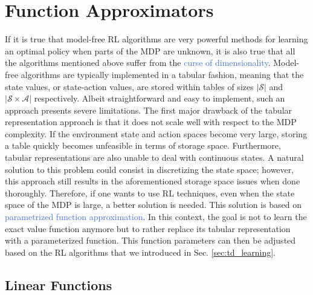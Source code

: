\section{Function Approximators}
\label{sec:function_approximators}
If it is true that model-free RL algorithms are very powerful methods for learning an optimal policy when parts of the MDP are unknown, it is also true that all the algorithms mentioned above suffer from the \textcolor{RoyalBlue}{curse of dimensionality}. Model-free algorithms are typically implemented in a tabular fashion, meaning that the state values, or state-action values, are stored within tables of sizes $|\mathcal{S}|$ and $|\mathcal{S}\times\mathcal{A}|$ respectively. Albeit straightforward and easy to implement, such an approach presents severe limitations. The first major drawback of the tabular representation approach is that it does not scale well with respect to the MDP complexity. If the environment state and action spaces become very large, storing a table quickly becomes unfeasible in terms of storage space. Furthermore, tabular representations are also unable to deal with continuous states. A natural solution to this problem could consist in discretizing the state space; however, this approach still results in the aforementioned storage space issues when done thoroughly. Therefore, if one wants to use RL techniques, even when the state space of the MDP is large, a better solution is needed. This solution is based on \textcolor{RoyalBlue}{parametrized function approximation}. In this context, the goal is not to learn the exact value function anymore but to rather replace its tabular representation with a parameterized function. This function parameters can then be adjusted based on the RL algorithms that we introduced in Sec. \ref{sec:td_learning}. 

\subsection{Linear Functions}
\label{sec:linear_functions}


